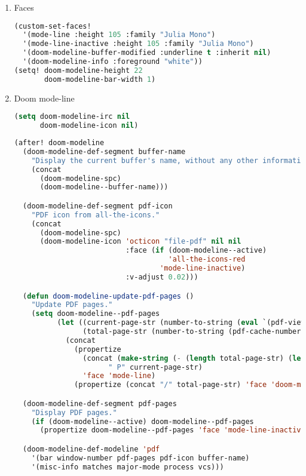 \documentclass[11pt]{article}
\begin{document}
\begin{enumerate}
  \item Faces
  \label{sec:faces}

  \begin{lstlisting}[language=Lisp]
(custom-set-faces!
  '(mode-line :height 105 :family "Julia Mono")
  '(mode-line-inactive :height 105 :family "Julia Mono")
  '(doom-modeline-buffer-modified :underline t :inherit nil)
  '(doom-modeline-info :foreground "white"))
(setq! doom-modeline-height 22
       doom-modeline-bar-width 1)
\end{lstlisting}
  \item Doom mode-line
  \label{sec:doom-mode-line}

  \begin{lstlisting}[language=Lisp]
(setq doom-modeline-irc nil
      doom-modeline-icon nil)
\end{lstlisting}

\begin{lstlisting}[language=Lisp]
(after! doom-modeline
  (doom-modeline-def-segment buffer-name
    "Display the current buffer's name, without any other information."
    (concat
      (doom-modeline-spc)
      (doom-modeline--buffer-name)))

  (doom-modeline-def-segment pdf-icon
    "PDF icon from all-the-icons."
    (concat
      (doom-modeline-spc)
      (doom-modeline-icon 'octicon "file-pdf" nil nil
                          :face (if (doom-modeline--active)
                                    'all-the-icons-red
                                  'mode-line-inactive)
                          :v-adjust 0.02)))

  (defun doom-modeline-update-pdf-pages ()
    "Update PDF pages."
    (setq doom-modeline--pdf-pages
          (let ((current-page-str (number-to-string (eval `(pdf-view-current-page))))
                (total-page-str (number-to-string (pdf-cache-number-of-pages))))
            (concat
              (propertize
                (concat (make-string (- (length total-page-str) (length current-page-str)) 32)
                      " P" current-page-str)
                'face 'mode-line)
              (propertize (concat "/" total-page-str) 'face 'doom-modeline-buffer-minor-mode)))))

  (doom-modeline-def-segment pdf-pages
    "Display PDF pages."
    (if (doom-modeline--active) doom-modeline--pdf-pages
      (propertize doom-modeline--pdf-pages 'face 'mode-line-inactive)))

  (doom-modeline-def-modeline 'pdf
    '(bar window-number pdf-pages pdf-icon buffer-name)
    '(misc-info matches major-mode process vcs)))

\end{lstlisting}
\end{enumerate}
\end{document}
